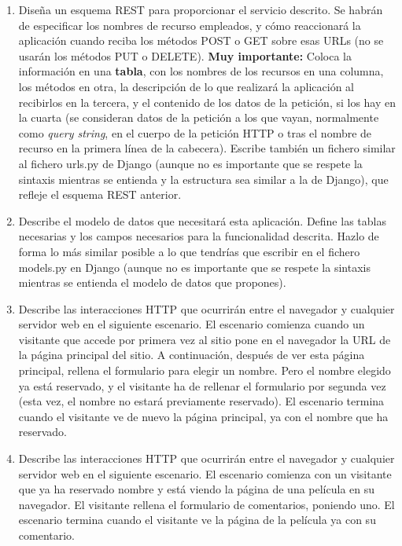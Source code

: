 \begin{enumerate}
\item Diseña un esquema REST para proporcionar el servicio descrito. Se habrán de especificar los nombres de recurso empleados, y cómo reaccionará la aplicación cuando reciba los métodos POST o GET sobre esas URLs (no se usarán los métodos PUT o DELETE). \textbf{Muy importante:} Coloca la información en una \textbf{tabla}, con los nombres de los recursos en una columna, los métodos en otra, la descripción de lo que realizará la aplicación al recibirlos en la tercera, y el contenido de los datos de la petición, si los hay en la cuarta (se consideran datos de la petición a los que vayan, normalmente como \emph{query string}, en el cuerpo de la petición HTTP o tras el nombre de recurso en la primera línea de la cabecera). Escribe también un fichero similar al fichero urls.py de Django (aunque no es importante que se respete la sintaxis mientras se entienda y la estructura sea similar a la de Django), que refleje el esquema REST anterior. 

\item Describe el modelo de datos que necesitará esta aplicación. Define las tablas necesarias y los campos necesarios para la funcionalidad descrita. Hazlo de forma lo más similar posible a lo que tendrías que escribir en el fichero models.py en Django (aunque no es importante que se respete la sintaxis mientras se entienda el modelo de datos que propones).

\item Describe las interacciones HTTP que ocurrirán entre el navegador y cualquier servidor web en el siguiente escenario. El escenario comienza cuando un visitante que accede por primera vez al sitio pone en el navegador la URL de la página principal del sitio. A continuación, después de ver esta página principal, rellena el formulario para elegir un nombre. Pero el nombre elegido ya está reservado, y el visitante ha de rellenar el formulario por segunda vez (esta vez, el nombre no estará previamente reservado). El escenario termina cuando el visitante ve de nuevo la página principal, ya con el nombre que ha reservado.

\item Describe las interacciones HTTP que ocurrirán entre el navegador y cualquier servidor web en el siguiente escenario. El escenario comienza con un visitante que ya ha reservado nombre y está viendo la página de una película en su navegador. El visitante rellena el formulario de comentarios, poniendo uno. El escenario termina cuando el visitante ve la página de la película ya con su comentario.


\end{enumerate}
